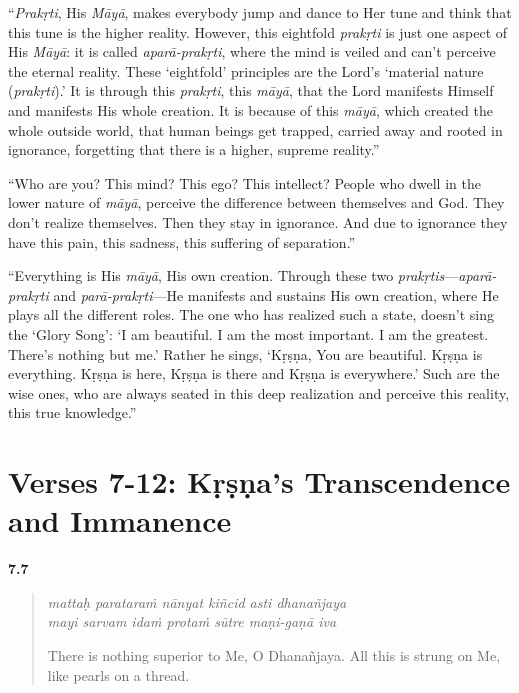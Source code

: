 \enquote{\textit{Prakṛti}, His \textit{Māyā}, makes everybody jump and dance to Her tune and think that this tune is the higher reality. However, this eightfold \textit{prakṛti} is just one aspect of His \textit{Māyā}: it is called \textit{aparā-prakṛti}, where the mind is veiled and can’t perceive the eternal reality. These \enquote{eightfold} principles are the Lord’s \enquote{material nature (\textit{prakṛti}).} It is through this \textit{prakṛti}, this \textit{māyā}, that the Lord manifests Himself and manifests His whole creation. It is because of this \textit{māyā}, which created the whole outside world, that human beings get trapped, carried away and rooted in ignorance, forgetting that there is a higher, supreme reality.}

\enquote{Who are you? This mind? This ego? This intellect? People who dwell in the lower nature of \textit{māyā}, perceive the difference between themselves and God. They don’t realize themselves. Then they stay in ignorance. And due to ignorance they have this pain, this sadness, this suffering of separation.}

\enquote{Everything is His \textit{māyā}, His own creation. Through these two \textit{prakṛtis}---\textit{aparā-prakṛti} and \textit{parā-prakṛti}---He manifests and sustains His own creation, where He plays all the different roles. The one who has realized such a state, doesn’t sing the \enquote{Glory Song}: \enquote{I am beautiful. I am the most important. I am the greatest. There’s nothing but me.} Rather he sings, \enquote{Kṛṣṇa, You are beautiful. Kṛṣṇa is everything. Kṛṣṇa is here, Kṛṣṇa is there and Kṛṣṇa is everywhere.} Such are the wise ones, who are always seated in this deep realization and perceive this reality, this true knowledge.}

\newpage
\section{Verses 7-12: Kṛṣṇa's Transcendence and Immanence}\label{sec-verses-7-12-krsna-s-transcendence-and-immanence}


\par\noindent\textbf{7.7}\par
\begin{verse}
\textit{mattaḥ parataraṁ nānyat kiñcid asti dhanañjaya} \\
\textit{mayi sarvam idaṁ protaṁ sūtre maṇi-gaṇā iva}

\noindent There is nothing superior to Me, O Dhanañjaya. All this is strung on Me, like pearls on a thread.
\end{verse}
\par



